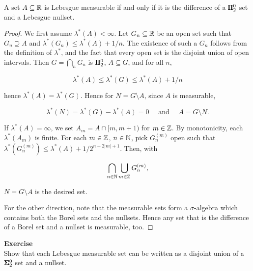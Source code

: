 \begin{proposition}\label{measurable-diff-borel}A set $A \subseteq \mathbb{R}$ is Lebesgue measurable if and only if it is the difference of a $\pmb{\Pi}^0_2$ set and a Lebesgue nullset.

\end{proposition}\begin{proof}We first assume $\lambda^*(A) < \infty$.  Let $G_n \subseteq \mathbb{R}$ be an open set such that $G_n \supseteq A$ and  $\lambda^*(G_n) \leq \lambda^*(A) + 1/n$. The existence of such a $G_n$ follows from the definition of $\lambda^*$, and the fact that every open set is the disjoint union of open intervals.  Then $G = \bigcap_n G_n$ is $\pmb{\Pi}^0_2$, $A \subseteq G$, and for all $n$,

\begin{equation}
\lambda^*(A) \leq \lambda^*(G) \leq \lambda^*(A) + 1/n
\end{equation}

hence $\lambda^*(A) = \lambda^*(G)$. Hence for $N = G \setminus A$, since $A$ is measurable,

\begin{equation}
\lambda^*(N) = \lambda^*(G) - \lambda^*(A)  = 0 \quad \text{ and } \quad A = G \setminus N.
\end{equation}

If $\lambda^*(A) = \infty$, we set $A_m = A \cap [m,m+1)$ for $m \in \mathbb{Z}$. By monotonicity, each $\lambda^*(A_m)$ is finite. For each $m \in \mathbb{Z}$, $n \in \mathbb{N}$, pick $G^{(m)}_n$ open such that $\lambda^*(G^{(m)}_n) \leq \lambda^*(A) + 1/2^{n+2|m|+1}$. Then, with

\begin{equation}
\bigcap_{n \in \mathbb{N}} \bigcup_{m \in \mathbb{Z}} G^{(m)}_n,
\end{equation}

$N = G\setminus A$ is the desired set.

For the other direction, note that the measurable sets form a $\sigma$-algebra which contains both the Borel sets and the nullsets. Hence any set that is the difference of a Borel set and a nullset is measurable, too.

\end{proof}\begin{framed}
\textbf{Exercise}\\
Show that each Lebesgue measurable set can be written as a disjoint union of a $\pmb{\Sigma}^0_2$ set and a nullset.
\end{framed}

